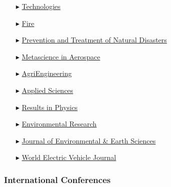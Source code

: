\begin{itemize}
    \item[$\blacktriangleright$] \href{https://www.mdpi.com/journal/technologies/}{Technologies}

    \item[$\blacktriangleright$] \href{https://www.mdpi.com/journal/fire/}{Fire}

    \item[$\blacktriangleright$] \href{https://ojs.ukscip.com/index.php/ptnd/}{Prevention and Treatment of Natural Disasters}

    \item[$\blacktriangleright$] \href{https://www.aimspress.com/journal/mina/}{Metascience in Aerospace}

    \item[$\blacktriangleright$] \href{https://www.mdpi.com/journal/agriengineering/}{AgriEngineering}

    \item[$\blacktriangleright$] \href{https://www.mdpi.com/journal/applsci/}{Applied Sciences}

    \item[$\blacktriangleright$] \href{https://www.sciencedirect.com/journal/results-in-physics/}{Results in Physics}

    \item[$\blacktriangleright$] \href{https://www.sciencedirect.com/journal/environmental-research/ }{Environmental Research}
    
    \item[$\blacktriangleright$] \href{https://journals.bilpubgroup.com/index.php/jees/}{Journal of Environmental \& Earth Sciences}

    \item[$\blacktriangleright$] \href{https://www.mdpi.com/journal/wevj/}{World Electric Vehicle Journal}
    
\end{itemize}

\separator
\subsubsection{International Conferences}

